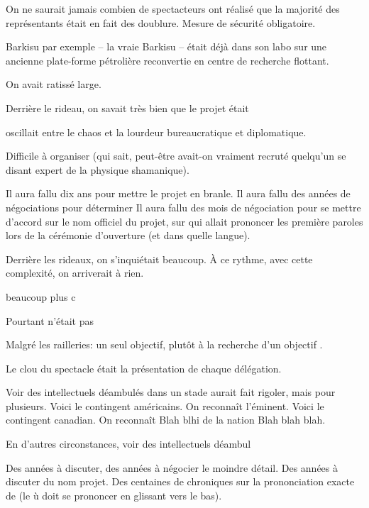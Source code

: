 


On ne saurait jamais combien de spectacteurs ont réalisé que la majorité des représentants 
était en fait des doublure. Mesure de sécurité obligatoire.

Barkisu par exemple -- la vraie Barkisu -- était déjà dans son labo sur une
ancienne plate-forme pétrolière reconvertie en centre de recherche flottant.




On avait ratissé large.


Derrière le rideau, on savait très bien que le projet \nomProjet{} était 

oscillait entre le chaos et la lourdeur bureaucratique et diplomatique.

Difficile à organiser (qui sait, peut-être avait-on vraiment recruté quelqu'un se disant expert de la physique shamanique).

Il aura fallu dix ans pour mettre le projet en branle.
Il aura fallu des années de négociations pour déterminer
Il aura fallu des mois de négociation pour se mettre d'accord sur le nom officiel du projet, sur qui allait prononcer les première paroles
lors de la cérémonie d'ouverture (et dans quelle langue).

Derrière les rideaux, on s'inquiétait beaucoup.
À ce rythme, avec cette complexité, on arriverait à rien.

beaucoup plus c

Pourtant \nomProjet{} n'était pas 



Malgré les railleries: un seul objectif, plutôt \og à la recherche d'un objectif \fg.





Le clou du spectacle était la présentation de chaque délégation.



Voir des intellectuels déambulés dans un stade aurait fait rigoler, mais pour
plusieurs. Voici le contingent américains. On reconnaît l'éminent.
Voici le contingent canadian. 
On reconnaît Blah blhi de la nation Blah blah blah.

En d'autres circonstances, 
voir des intellectuels déambul

Des années à discuter, des années à négocier le moindre détail. 
Des années à discuter du nom projet. Des centaines de chroniques
sur la prononciation exacte de \nomProjet{} (le \og ù \fg doit se prononcer en glissant vers le bas).


